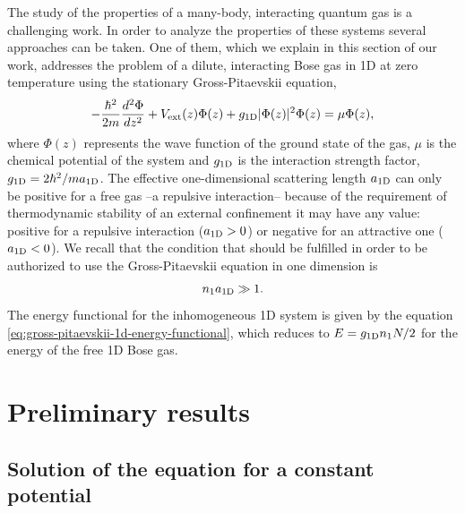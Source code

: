 The study of the properties of a many-body, interacting quantum gas is a
challenging work. In order to analyze the properties of these systems several
approaches can be taken. One of them, which we explain in this section of our
work, addresses the problem of a dilute, interacting Bose gas in 1D at zero
temperature using the stationary Gross-Pitaevskii equation,
%
\begin{equation}
  -\frac{\hbar^2}{2m}\frac{d^2\Phi}{dz^2} + V_{\mathrm{ext}}(z) \Phi(z) + g_{ \mathrm{1D} } |\Phi(z)|^2 \Phi(z)
  = \mu \Phi(z),
\end{equation}
%
where $\Phi(z)$ represents the wave function of the ground state of the gas,
$\mu$ is the chemical potential of the system and $g_{ \mathrm{1D} }$ is the interaction
strength factor, $g_{ \mathrm{1D} } = {2\hbar^2}/{m a_{ \mathrm{1D} }}$. The effective
one-dimensional scattering length $a_{ \mathrm{1D} }$ can only be positive for a free
gas --a repulsive interaction-- because of the requirement of thermodynamic
stability %
of an  external confinement it may have any value: positive for a repulsive
interaction ($a_{ \mathrm{1D} } > 0$) or negative for an attractive one ($a_{ \mathrm{1D} } <
  0$). We recall that the condition that should be fulfilled in order to be
authorized to use the Gross-Pitaevskii equation in one dimension is
%
\begin{equation}
  \label{eq:mean-field-regime-condition}
  {{n}_1} a_{ \mathrm{1D} } \gg 1.
\end{equation}
%
The energy functional for the inhomogeneous 1D system is given by the equation
\eqref{eq:gross-pitaevskii-1d-energy-functional}, which reduces to $E = g_{ \mathrm{1D} }
  {{n}_1} N / 2$ for the energy of the free 1D Bose gas.


%



\section{Preliminary results}

\subsection{Solution of the {\GP} equation for a constant potential}

